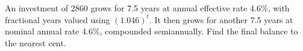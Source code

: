 An investment of $ 2860 $ grows for 7.5 years at annual effective rate 4.6\%, with fractional years valued using $(1.046)^t $. It then grows for another 7.5 years at nominal annual rate 4.6\%, compounded semiannually. Find the final balance to the nearest cent.
